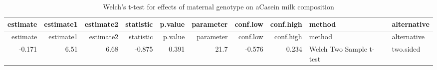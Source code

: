 \documentclass[]{article}
\begin{document}
\begin{longtable}[]{@{}rrrrrrrrll@{}}
\caption{Welch's t-test for effects of maternal genotype on aCasein milk
composition}\tabularnewline
\toprule
estimate & estimate1 & estimate2 & statistic & p.value & parameter &
conf.low & conf.high & method & alternative\tabularnewline
\midrule
\endfirsthead
\toprule
estimate & estimate1 & estimate2 & statistic & p.value & parameter &
conf.low & conf.high & method & alternative\tabularnewline
\midrule
\endhead
-0.171 & 6.51 & 6.68 & -0.875 & 0.391 & 21.7 & -0.576 & 0.234 & Welch
Two Sample t-test & two.sided\tabularnewline
\bottomrule
\end{longtable}
\end{document}
